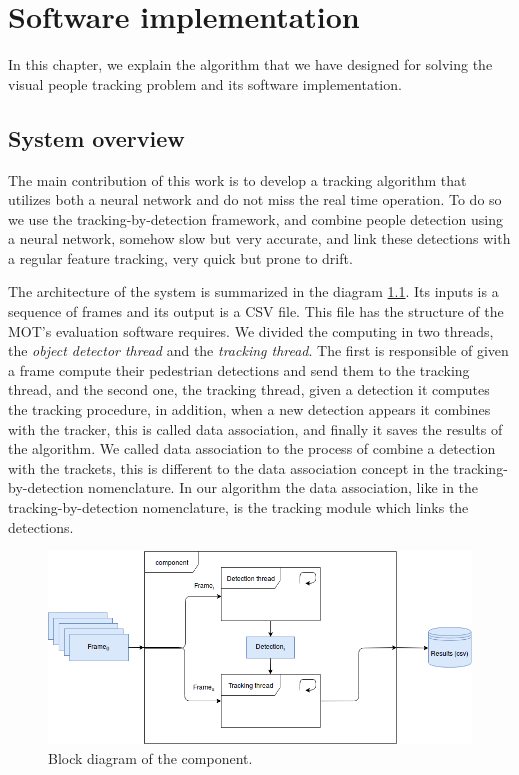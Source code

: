 \chapter{Software implementation}\label{cap.software}

In this chapter, we explain the algorithm that we have designed for solving the visual people tracking problem and its software implementation. 

\section{System overview}

The main contribution of this work is to develop a tracking algorithm that utilizes both a neural network and do not miss the real time operation. To do so we use the tracking-by-detection framework, and combine people detection using a neural network, somehow slow but very accurate, and link these detections with a regular feature tracking, very quick but prone to drift. 

The architecture of the system is summarized in the diagram \ref{software1}. Its inputs is a sequence of frames and its output is a CSV file. This file has the structure of the MOT's evaluation software requires. We divided the computing in two threads, the \textit{object detector thread} and the \textit{tracking thread}. The first is responsible of given a frame compute their pedestrian detections and send them to the tracking thread, and the second one, the tracking thread, given a detection it computes the tracking procedure, in addition, when a new detection appears it combines with the tracker, this is called data association, and finally it saves the results of the algorithm. We called data association to the process of combine a detection with the trackets, this is different to the data association concept in the tracking-by-detection nomenclature. In our algorithm the data association, like in the tracking-by-detection nomenclature, is the tracking module which links the detections. 



\begin{figure}[H]
\centering         
\includegraphics[width=12cm]{flows/bloque.png}
\caption{Block diagram of the component.} \label{software1}
\end{figure}


